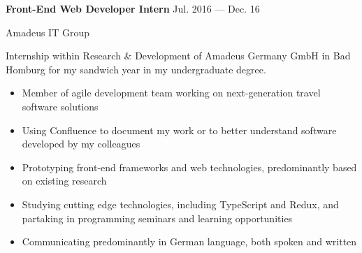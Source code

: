\parbox[t][][t]{\linewidth}{
	\parbox{\linewidth}{{\textbf{Front-End Web Developer Intern}}
		\hfill {{Jul. 2016 --- Dec. 16}}}
	\smallbreak
	
	\parbox{\linewidth}{Amadeus IT Group}
	
	\bigskip
	Internship within Research \& Development of Amadeus Germany GmbH in Bad Homburg for my sandwich year in my undergraduate degree.
	
	\bigskip
	\begin{itemize}
		\item{Member of agile development team working on next-generation travel software solutions}\\[-.6em]
		\item{Using Confluence to document my work or to better understand software developed by my colleagues}\\[-.6em]
		\item{Prototyping front-end frameworks and web technologies, predominantly based on existing research}\\[-.6em]
		\item{Studying cutting edge technologies, including TypeScript and Redux, and partaking in programming seminars and learning opportunities}\\[-.6em]
		\item{Communicating predominantly in German language, both spoken and written}\\[-.6em]
	\end{itemize}
}
